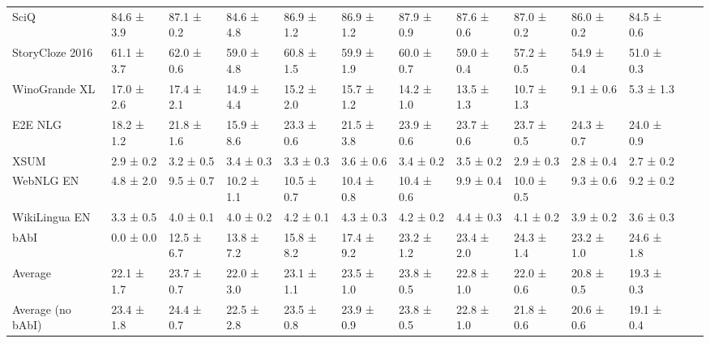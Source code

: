 \documentclass{article}
\begin{document}
\begin{table}[htbp]
{\begin{tabular}{l|l|lllllllllll}
SciQ & 84.6 ± 3.9 & 87.1 ± 0.2 & 84.6 ± 4.8 & 86.9 ± 1.2 & 86.9 ± 1.2 & 87.9 ± 0.9 & 87.6 ± 0.6 & 87.0 ± 0.2 & 86.0 ± 0.2 & 84.5 ± 0.6 \\
StoryCloze 2016 & 61.1 ± 3.7 & 62.0 ± 0.6 & 59.0 ± 4.8 & 60.8 ± 1.5 & 59.9 ± 1.9 & 60.0 ± 0.7 & 59.0 ± 0.4 & 57.2 ± 0.5 & 54.9 ± 0.4 & 51.0 ± 0.3 \\
WinoGrande XL & 17.0 ± 2.6 & 17.4 ± 2.1 & 14.9 ± 4.4 & 15.2 ± 2.0 & 15.7 ± 1.2 & 14.2 ± 1.0 & 13.5 ± 1.3 & 10.7 ± 1.3 & 9.1 ± 0.6 & 5.3 ± 1.3 \\
\midrule
E2E NLG & 18.2 ± 1.2 & 21.8 ± 1.6 & 15.9 ± 8.6 & 23.3 ± 0.6 & 21.5 ± 3.8 & 23.9 ± 0.6 & 23.7 ± 0.6 & 23.7 ± 0.5 & 24.3 ± 0.7 & 24.0 ± 0.9 \\
XSUM & 2.9 ± 0.2 & 3.2 ± 0.5 & 3.4 ± 0.3 & 3.3 ± 0.3 & 3.6 ± 0.6 & 3.4 ± 0.2 & 3.5 ± 0.2 & 2.9 ± 0.3 & 2.8 ± 0.4 & 2.7 ± 0.2 \\
WebNLG EN & 4.8 ± 2.0 & 9.5 ± 0.7 & 10.2 ± 1.1 & 10.5 ± 0.7 & 10.4 ± 0.8 & 10.4 ± 0.6 & 9.9 ± 0.4 & 10.0 ± 0.5 & 9.3 ± 0.6 & 9.2 ± 0.2 \\
WikiLingua EN & 3.3 ± 0.5 & 4.0 ± 0.1 & 4.0 ± 0.2 & 4.2 ± 0.1 & 4.3 ± 0.3 & 4.2 ± 0.2 & 4.4 ± 0.3 & 4.1 ± 0.2 & 3.9 ± 0.2 & 3.6 ± 0.3 \\
\midrule
bAbI & 0.0 ± 0.0 & 12.5 ± 6.7 & 13.8 ± 7.2 & 15.8 ± 8.2 & 17.4 ± 9.2 & 23.2 ± 1.2 & 23.4 ± 2.0 & 24.3 ± 1.4 & 23.2 ± 1.0 & 24.6 ± 1.8 \\
\midrule
Average & 22.1 ± 1.7 & 23.7 ± 0.7 & 22.0 ± 3.0 & 23.1 ± 1.1 & 23.5 ± 1.0 & 23.8 ± 0.5 & 22.8 ± 1.0 & 22.0 ± 0.6 & 20.8 ± 0.5 & 19.3 ± 0.3 \\
Average (no bAbI) & 23.4 ± 1.8 & 24.4 ± 0.7 & 22.5 ± 2.8 & 23.5 ± 0.8 & 23.9 ± 0.9 & 23.8 ± 0.5 & 22.8 ± 1.0 & 21.8 ± 0.6 & 20.6 ± 0.6 & 19.1 ± 0.4 \\
\bottomrule
  \end{tabular}
  }
  \label{tab:4b2py}
\end{table}
\end{document}
